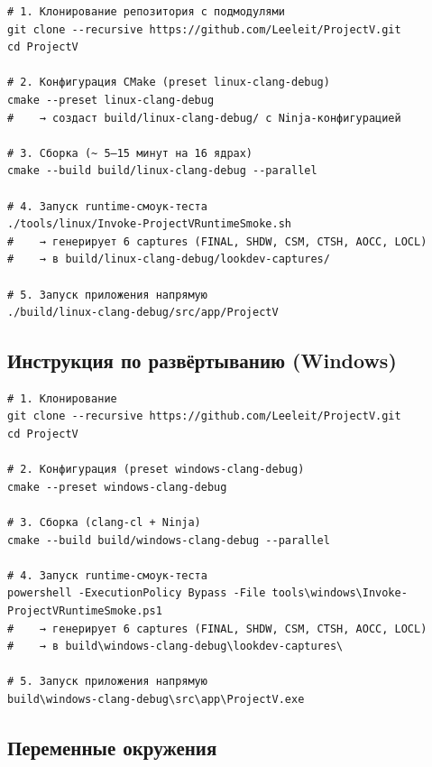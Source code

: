 \documentclass[
  11pt,a4paper,oneside]{article}
\begin{document}
\begin{verbatim}
# 1. Клонирование репозитория с подмодулями
git clone --recursive https://github.com/Leeleit/ProjectV.git
cd ProjectV

# 2. Конфигурация CMake (preset linux-clang-debug)
cmake --preset linux-clang-debug
#    → создаст build/linux-clang-debug/ с Ninja-конфигурацией

# 3. Сборка (~ 5–15 минут на 16 ядрах)
cmake --build build/linux-clang-debug --parallel

# 4. Запуск runtime-смоук-теста
./tools/linux/Invoke-ProjectVRuntimeSmoke.sh
#    → генерирует 6 captures (FINAL, SHDW, CSM, CTSH, AOCC, LOCL)
#    → в build/linux-clang-debug/lookdev-captures/

# 5. Запуск приложения напрямую
./build/linux-clang-debug/src/app/ProjectV
\end{verbatim}

\subsection{Инструкция по развёртыванию (Windows)}\label{ux438ux43dux441ux442ux440ux443ux43aux446ux438ux44f-ux43fux43e-ux440ux430ux437ux432ux451ux440ux442ux44bux432ux430ux43dux438ux44e-windows}

\begin{verbatim}
# 1. Клонирование
git clone --recursive https://github.com/Leeleit/ProjectV.git
cd ProjectV

# 2. Конфигурация (preset windows-clang-debug)
cmake --preset windows-clang-debug

# 3. Сборка (clang-cl + Ninja)
cmake --build build/windows-clang-debug --parallel

# 4. Запуск runtime-смоук-теста
powershell -ExecutionPolicy Bypass -File tools\windows\Invoke-ProjectVRuntimeSmoke.ps1
#    → генерирует 6 captures (FINAL, SHDW, CSM, CTSH, AOCC, LOCL)
#    → в build\windows-clang-debug\lookdev-captures\

# 5. Запуск приложения напрямую
build\windows-clang-debug\src\app\ProjectV.exe
\end{verbatim}

\subsection{Переменные окружения}\label{ux43fux435ux440ux435ux43cux435ux43dux43dux44bux435-ux43eux43aux440ux443ux436ux435ux43dux438ux44f}
\end{document}
